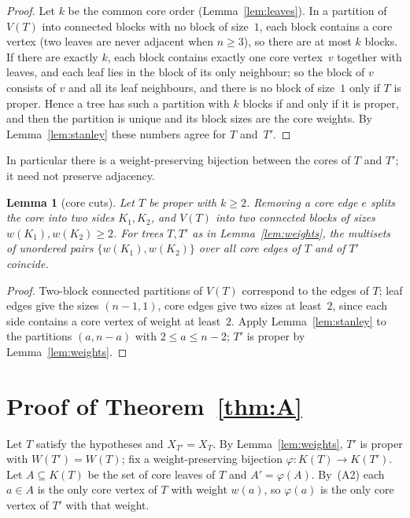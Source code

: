 \documentclass[11pt]{article}
\newtheorem{lemma}{Lemma}
\theoremstyle{definition}
\theoremstyle{remark}
\begin{document}
\begin{proof}
Let $k$ be the common core order (Lemma~\ref{lem:leaves}). In a partition of
$V(T)$ into connected blocks with no block of size~$1$, each block contains a
core vertex (two leaves are never adjacent when $n\ge3$), so there are at most
$k$ blocks. If there are exactly $k$, each block contains exactly one core
vertex~$v$ together with leaves, and each leaf lies in the block of its only
neighbour; so the block of $v$ consists of $v$ and all its leaf neighbours, and
there is no block of size~$1$ only if $T$ is proper. Hence a tree has such a
partition with $k$ blocks if and only if it is proper, and then the partition is
unique and its block sizes are the core weights. By Lemma~\ref{lem:stanley}
these numbers agree for $T$ and~$T'$.
\end{proof}

\noindent In particular there is a weight-preserving bijection between the cores
of $T$ and $T'$; it need not preserve adjacency.

\begin{lemma}[core cuts]\label{lem:cuts}
Let $T$ be proper with $k\ge2$. Removing a core edge $e$ splits the core into
two sides $K_1,K_2$, and $V(T)$ into two connected blocks of sizes
$w(K_1),w(K_2)\ge2$. For trees $T,T'$ as in Lemma~\ref{lem:weights}, the
multisets of unordered pairs $\{w(K_1),w(K_2)\}$ over all core edges of $T$
and of $T'$ coincide.
\end{lemma}

\begin{proof}
Two-block connected partitions of $V(T)$ correspond to the edges of $T$; leaf
edges give the sizes $(n-1,1)$, core edges give two sizes at least~$2$, since
each side contains a core vertex of weight at least~$2$. Apply
Lemma~\ref{lem:stanley} to the partitions $(a,n-a)$ with $2\le a\le n-2$; $T'$
is proper by Lemma~\ref{lem:weights}.
\end{proof}

\section{Proof of Theorem~\ref{thm:A}}\label{sec:A}

Let $T$ satisfy the hypotheses and $X_{T'}=X_T$. By Lemma~\ref{lem:weights}, $T'$
is proper with $W(T')=W(T)$; fix a weight-preserving bijection
$\varphi:K(T)\to K(T')$. Let $A\subseteq K(T)$ be the set of core leaves of $T$
and $A'=\varphi(A)$. By~(A2) each $a\in A$ is the only core vertex of $T$ with
weight $w(a)$, so $\varphi(a)$ is the only core vertex of $T'$ with that weight.
\end{document}
